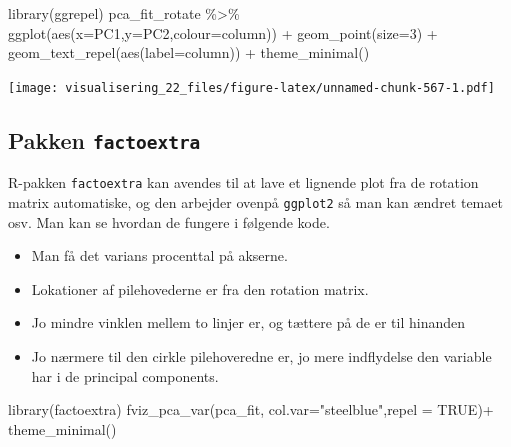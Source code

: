 \documentclass[
]{book}
\newenvironment{Shaded}{\begin{snugshade}}{\end{snugshade}}
\newcommand{\AttributeTok}[1]{\textcolor[rgb]{0.77,0.63,0.00}{#1}}
\newcommand{\ConstantTok}[1]{\textcolor[rgb]{0.00,0.00,0.00}{#1}}
\newcommand{\DecValTok}[1]{\textcolor[rgb]{0.00,0.00,0.81}{#1}}
\newcommand{\FunctionTok}[1]{\textcolor[rgb]{0.00,0.00,0.00}{#1}}
\newcommand{\NormalTok}[1]{#1}
\newcommand{\SpecialCharTok}[1]{\textcolor[rgb]{0.00,0.00,0.00}{#1}}
\newcommand{\StringTok}[1]{\textcolor[rgb]{0.31,0.60,0.02}{#1}}
\providecommand{\tightlist}{%
  \setlength{\itemsep}{0pt}\setlength{\parskip}{0pt}}
\begin{document}
\begin{Shaded}
\begin{Highlighting}[]
\FunctionTok{library}\NormalTok{(ggrepel)}
\NormalTok{pca\_fit\_rotate }\SpecialCharTok{\%\textgreater{}\%}
  \FunctionTok{ggplot}\NormalTok{(}\FunctionTok{aes}\NormalTok{(}\AttributeTok{x=}\NormalTok{PC1,}\AttributeTok{y=}\NormalTok{PC2,}\AttributeTok{colour=}\NormalTok{column)) }\SpecialCharTok{+} 
  \FunctionTok{geom\_point}\NormalTok{(}\AttributeTok{size=}\DecValTok{3}\NormalTok{) }\SpecialCharTok{+} 
  \FunctionTok{geom\_text\_repel}\NormalTok{(}\FunctionTok{aes}\NormalTok{(}\AttributeTok{label=}\NormalTok{column)) }\SpecialCharTok{+} 
  \FunctionTok{theme\_minimal}\NormalTok{()}
\end{Highlighting}
\end{Shaded}

\texttt{[image: visualisering\_22\_files/figure-latex/unnamed-chunk-567-1.pdf]}

\hypertarget{pakken-factoextra}{%
\subsection{\texorpdfstring{Pakken \texttt{factoextra}}{Pakken factoextra}}\label{pakken-factoextra}}

R-pakken \texttt{factoextra} kan avendes til at lave et lignende plot fra de rotation matrix automatiske, og den arbejder ovenpå \texttt{ggplot2} så man kan ændret temaet osv. Man kan se hvordan de fungere i følgende kode.

\begin{itemize}
\tightlist
\item
  Man få det varians procenttal på akserne.
\item
  Lokationer af pilehovederne er fra den rotation matrix.
\item
  Jo mindre vinklen mellem to linjer er, og tættere på de er til hinanden
\item
  Jo nærmere til den cirkle pilehoveredne er, jo mere indflydelse den variable har i de principal components.
\end{itemize}

\begin{Shaded}
\begin{Highlighting}[]
\FunctionTok{library}\NormalTok{(factoextra)}
\FunctionTok{fviz\_pca\_var}\NormalTok{(pca\_fit, }\AttributeTok{col.var=}\StringTok{"steelblue"}\NormalTok{,}\AttributeTok{repel =} \ConstantTok{TRUE}\NormalTok{)}\SpecialCharTok{+}
  \FunctionTok{theme\_minimal}\NormalTok{()}
\end{Highlighting}
\end{Shaded}
\end{document}
